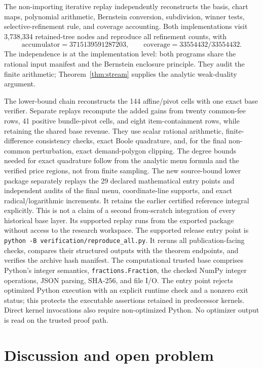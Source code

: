 \documentclass[11pt]{article}
\begin{document}
The non-importing iterative replay independently reconstructs the basis, chart
maps, polynomial arithmetic, Bernstein conversion, subdivision, winner tests,
selective-refinement rule, and coverage accounting.  Both implementations
visit 3,738,334 retained-tree nodes and reproduce all refinement counts, with
\[
\text{accumulator}=3715139591287203,\qquad
\text{coverage}=33554432/33554432.
\]
The independence is at the implementation level: both programs share the
rational input manifest and the Bernstein enclosure principle.  They audit
the finite arithmetic; Theorem~\ref{thm:stream} supplies the analytic
weak-duality argument.

The lower-bound chain reconstructs the 144 affine/pivot cells with one exact
base verifier.  Separate replays recompute the added gains from twenty
common-fee rows, 41 positive bundle-pivot cells, and eight item-containment
rows, while retaining the shared base revenue.  They use scalar rational
arithmetic, finite-difference consistency checks, exact Boole quadrature,
and, for the final non-common perturbation, exact demand-polygon clipping.
The degree bounds needed for exact quadrature follow from the analytic menu
formula and the verified price regions, not from finite sampling.
The new source-bound lower package separately replays the 29 declared
mathematical entry points and independent audits of the final menu,
coordinate-line supports, and exact radical/logarithmic increments. It
retains the earlier certified reference integral explicitly. This is not a
claim of a second from-scratch integration of every historical base layer.
Its supported replay runs from the exported package without access to the
research workspace. The supported release entry point is
\texttt{python -B verification/reproduce\_all.py}.  It reruns all
publication-facing checks,
compares their structured outputs with the theorem endpoints, and verifies the
archive hash manifest.  The computational trusted base comprises Python's
integer semantics, \texttt{fractions.Fraction}, the checked NumPy integer
operations, JSON parsing, SHA-256, and file I/O.  The entry point rejects
optimized Python execution with an explicit runtime check and a nonzero exit
status; this protects the executable assertions retained in predecessor
kernels.  Direct kernel invocations also require non-optimized Python.
No optimizer output is read on the trusted proof path.

\section{Discussion and open problem}
\end{document}
